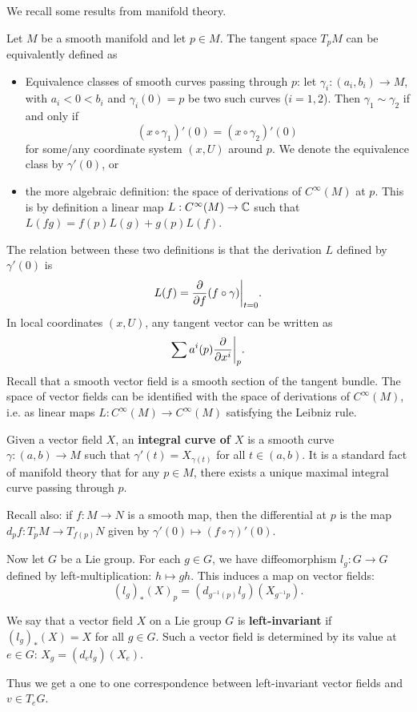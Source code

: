 \documentclass[11pt, english]{article}
\begin{document}
We recall some results from manifold theory.

Let $M$ be a smooth manifold and let $p \in M$. The tangent space $T_pM$ can be equivalently defined as
\begin{itemize}
\item Equivalence classes of smooth curves passing through $p$: let $\gamma_i:(a_i,b_i) \to M$, with $a_i < 0 < b_i$ and $\gamma_i(0)=p$ be two such curves ($i=1,2$). Then $\gamma_1 \sim \gamma_2$ if and only if 
$$
(x \circ \gamma_1)'(0) = (x \circ \gamma_2)'(0)
$$
for some/any coordinate system $(x,U)$ around $p$. We denote the equivalence class by $\gamma'(0)$, or
\item the more algebraic definition: the space of derivations of $C^\infty (M)$ at $p$. This is by definition a linear map $L:C^\infty(M) \to \mathbb{C}$ such that $L(fg) = f(p)L(g) + g(p)L(f)$.
\end{itemize}
The relation between these two definitions is that the derivation $L$ defined by $\gamma'(0)$ is
$$
L(f) = \restr{\dd{}{f}(f \circ \gamma)}{t=0}.
$$
In local coordinates $(x,U)$, any tangent vector can be written as
$$
\sum a^i(p) \restr{\dd{}{x^i}}{p}.
$$
Recall that a smooth vector field is a smooth section of the tangent bundle. The space of vector fields can be identified with the space of derivations of $C^\infty(M)$, i.e. as linear maps $L:C^\infty(M) \to C^\infty(M)$ satisfying the Leibniz rule.

Given a vector field $X$, an \textbf{integral curve of $X$} is a smooth curve $\gamma:(a,b) \to M$ such that $\gamma'(t) = X_{\gamma(t)}$ for all $t \in (a,b)$. It is a standard fact of manifold theory that for any $p \in M$, there exists a unique maximal integral curve passing through $p$. 

Recall also: if $f:M \to N$ is a smooth map, then the differential at $p$ is the map  $d_pf:T_pM \to T_{f(p)}N$ given by $\gamma'(0) \mapsto (f \circ \gamma)'(0)$. 

Now let $G$ be a Lie group. For each $g \in G$, we have diffeomorphism $l_g:G \to G$ defined by left-multiplication: $h \mapsto gh$. This induces a map on vector fields:
$$
(l_g)_\ast(X)_p = (d_{g^{-1}(p)} l_g)(X_{g^{-1}p}).
$$

We say that a vector field $X$ on a Lie group $G$ is \textbf{left-invariant} if $(l_g)_\ast(X)=X$ for all $g \in G$. Such a vector field is determined by its value at $e \in G$: $X_g = (d_e l_g)(X_e)$.

Thus we get a one to one correspondence between left-invariant vector fields and $v \in T_eG$.
 
\end{document}

